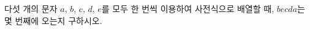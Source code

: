 \hspace*{2mm}\begin{minipage}[t]{\dimexpr\linewidth-2mm\relax}\vspace{0pt}
다섯 개의 문자 $a$, $b$, $c$, $d$, $e$를 모두 한 번씩 이용하여 사전식으로 배열할 때, $becda$는 몇 번째에 오는지 구하시오.\end{minipage}
